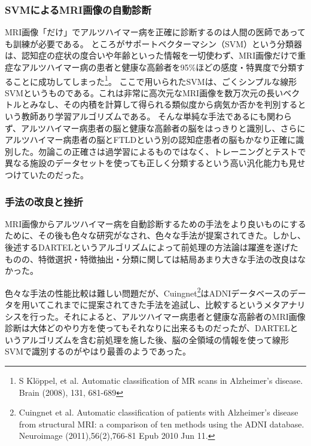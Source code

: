 \subsubsection{SVMによるMRI画像の自動診断}
MRI画像「だけ」でアルツハイマー病を正確に診断するのは人間の医師であっても訓練が必要である。
ところがサポートベクターマシン（SVM）という分類器は、認知症の症状の度合いや年齢といった情報を一切使わず、MRI画像だけで重症なアルツハイマー病の患者と健康な高齢者を95\%ほどの感度・特異度で分類することに成功してしまった\footnote{S Kl\"{o}ppel, et al. Automatic classification of MR scans in Alzheimer's disease. Brain (2008), 131, 681-689}。
ここで用いられたSVMは、ごくシンプルな線形SVMというものである。これは非常に高次元なMRI画像を数万次元の長いベクトルとみなし、その内積を計算して得られる類似度から病気か否かを判別するという教師あり学習アルゴリズムである。
そんな単純な手法であるにも関わらず、アルツハイマー病患者の脳と健康な高齢者の脳をはっきりと識別し、さらにアルツハイマー病患者の脳とFTLDという別の認知症患者の脳もかなり正確に識別した。勿論この正確さは過学習によるものではなく、トレーニングとテストで異なる施設のデータセットを使っても正しく分類するという高い汎化能力も見せつけていたのだった。

\subsubsection{手法の改良と挫折}
MRI画像からアルツハイマー病を自動診断するための手法をより良いものにするために、その後も色々な研究がなされ、色々な手法が提案されてきた。しかし、後述するDARTELというアルゴリズムによって前処理の方法論は躍進を遂げたものの、特徴選択・特徴抽出・分類に関しては結局あまり大きな手法の改良はなかった。

色々な手法の性能比較は難しい問題だが、Cuingnet\footnote{Cuingnet et al. Automatic classification of patients with Alzheimer's disease from structural MRI: a comparison of ten methods using the ADNI database. Neuroimage (2011),56(2),766-81 Epub 2010 Jun 11.}はADNIデータベースのデータを用いてこれまでに提案されてきた手法を追試し、比較するというメタアナリシスを行った。それによると、アルツハイマー病患者と健康な高齢者のMRI画像診断は大体どのやり方を使ってもそれなりに出来るものだったが、DARTELというアルゴリズムを含む前処理を施した後、脳の全領域の情報を使って線形SVMで識別するのがやはり最善のようであった。

